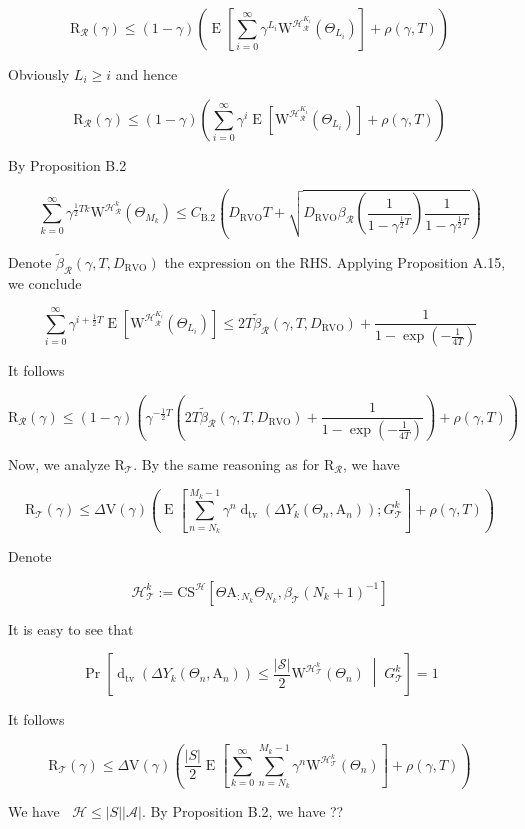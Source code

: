 \documentclass[a4paper]{article}
\newcommand{\AP}[1]{\left(#1\right)}
\newcommand{\AB}[1]{\left[#1\right]}
\newcommand{\ABM}[2]{\left[#1\;\middle\vert\;#2\right]}
\newcommand{\Abs}[1]{\left\vert #1 \right\vert}
\newcommand{\CPb}[2]{\operatorname{Pr}\ABM{#1}{#2}}
\newcommand{\E}[1]{\operatorname{E}\AB{#1}}
\newcommand{\Dtva}[1]{\operatorname{d}_{\text{tv}}\AP{#1}}
\newcommand{\St}{\mathcal{S}}
\newcommand{\A}{\mathcal{A}}
\newcommand{\R}{\mathcal{R}}
\newcommand{\T}{\mathcal{T}}
\newcommand{\Hy}{\mathcal{H}}
\DeclareMathOperator{\RVO}{\dim_{RVO}}
\newcommand{\DRVO}{D_{\mathrm{RVO}}}
\newcommand{\V}{\mathrm{V}}
\newcommand{\Reg}{\mathrm{R}}
\newcommand{\SHy}{Y}
\newcommand{\AT}{\mathrm{A}}
\newcommand{\ET}{N}
\newcommand{\IT}{M}
\newcommand{\CSE}{G}
\newcommand{\CS}{\mathrm{CS}}
\newcommand{\W}{\mathrm{W}}
\begin{document}
$$\Reg_\R(\gamma)\leq(1-\gamma)\AP{\E{\sum_{i=0}^\infty\gamma^{L_i}\W^{\Hy_\R^{K_i}}\AP{\Theta_{L_i}}}+\rho(\gamma,T)}$$

Obviously $L_i\geq i$ and hence

$$\Reg_\R(\gamma)\leq(1-\gamma)\AP{\sum_{i=0}^\infty\gamma^{i}\E{\W^{\Hy_\R^{K_i}}\AP{\Theta_{L_i}}}+\rho(\gamma,T)}$$

By Proposition B.2

$$\sum_{k=0}^\infty\gamma^{\frac{1}{2}Tk}\W^{\Hy_\R^{k}}\AP{\Theta_{M_k}}\leq C_{\text{B.2}}\AP{\DRVO T+\sqrt{\DRVO\beta_\R\AP{\frac{1}{1-\gamma^{\frac{1}{2}T}}}\frac{1}{1-\gamma^{\frac{1}{2}T}}}}$$

Denote $\tilde{\beta}_\R(\gamma,T,\DRVO)$ the expression on the RHS. Applying Proposition A.15, we conclude

$$\sum_{i=0}^\infty\gamma^{i+\frac{1}{2}T}\E{\W^{\Hy_\R^{K_i}}\AP{\Theta_{L_i}}}\leq 2T\tilde{\beta}_\R(\gamma,T,\DRVO)+\frac{1}{1-\exp\AP{-\frac{1}{4T}}}$$

It follows

$$\Reg_\R(\gamma)\leq(1-\gamma)\AP{\gamma^{-\frac{1}{2}T}\AP{2T\tilde{\beta}_\R(\gamma,T,\DRVO)+\frac{1}{1-\exp\AP{-\frac{1}{4T}}}}+\rho(\gamma,T)}$$

Now, we analyze $\Reg_{\T}$. By the same reasoning as for $\Reg_\R$, we have

$$\Reg_\T(\gamma)\leq\Delta\V(\gamma)\AP{\E{\sum_{n=\ET_k}^{\IT_k-1}\gamma^{n}\Dtva{\Delta\SHy_k\AP{\Theta_n,\AT_n}};\CSE_\T^k}+\rho(\gamma,T)}$$

Denote

$$\Hy_\T^k:=\CS^\Hy\AB{\Theta\AT_{:N_k}\Theta_{N_k},\beta_\T\AP{N_k+1}^{-1}}$$

It is easy to see that

$$\CPb{\Dtva{\Delta\SHy_k\AP{\Theta_n,\AT_n}}\leq\frac{\Abs{\St}}{2}\W^{\Hy_\T^k}\AP{\Theta_n}}{\CSE_\T^k}=1$$

It follows

$$\Reg_\T(\gamma)\leq\Delta\V(\gamma)\AP{\frac{\Abs{S}}{2}\E{\sum_{k=0}^\infty\sum_{n=\ET_k}^{\IT_k-1}\gamma^{n}\W^{\Hy_\T^k}\AP{\Theta_n}}+\rho(\gamma,T)}$$

We have $\RVO\Hy\leq\Abs{S}\Abs{\A}$. By Proposition B.2, we have ??

\end{document}
